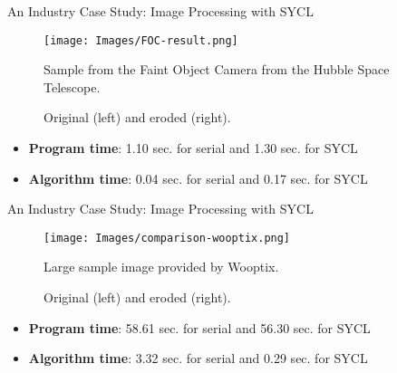 \begin{frame}{An Industry Case Study: Image Processing with SYCL}
  \begin{figure}[H]
    \centering
    \texttt{[image: Images/FOC-result.png]}

    Sample from the Faint Object Camera from the Hubble Space Telescope.
    
    Original (left) and eroded (right).
  \end{figure}
  \begin{itemize}
    \item \textbf{Program time}: 1.10 sec. for serial and 1.30 sec. for SYCL
    \item \textbf{Algorithm time}: 0.04 sec. for serial and 0.17 sec. for SYCL
  \end{itemize}
\end{frame}
\begin{frame}{An Industry Case Study: Image Processing with SYCL}
  \begin{figure}[H]
    \centering
    \texttt{[image: Images/comparison-wooptix.png]}

    Large sample image provided by Wooptix.
    
    Original (left) and eroded (right).
  \end{figure}
  \begin{itemize}
    \item \textbf{Program time}: 58.61 sec. for serial and 56.30 sec. for SYCL
    \item \textbf{Algorithm time}: 3.32 sec. for serial and 0.29 sec. for SYCL
  \end{itemize}
\end{frame}
